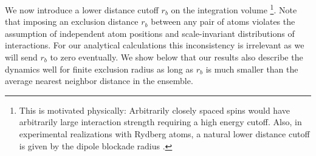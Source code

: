 \documentclass[aps,twocolumn,
superscriptaddress,
footinbib,
prl]{revtex4-1}
\begin{document}
We now introduce a lower distance cutoff $r_b$ on the integration volume \footnote{This is motivated physically: Arbitrarily closely spaced spins would have arbitrarily large interaction strength requiring a high energy cutoff. Also, in experimental realizations with Rydberg atoms, a natural lower distance cutoff is given by the dipole blockade radius \cite{Comparat2010}.}. Note that imposing an exclusion distance $r_b$ between any pair of atoms violates the assumption of independent atom positions and scale-invariant distributions of interactions. 
For our analytical calculations this inconsistency is irrelevant as we will send $r_b$ to zero eventually. We show below that our results also describe the dynamics well for finite exclusion radius as long as $r_b$ is much smaller than the average nearest neighbor distance in the ensemble.
\end{document}
